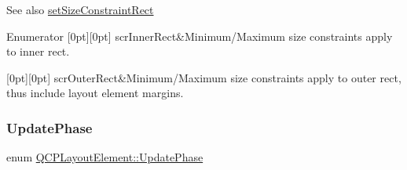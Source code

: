 \begin{DoxySeeAlso}{See also}
\mbox{\hyperlink{class_q_c_p_layout_element_a361666cdcc6fbfd37344cc44be746b0f}{set\+Size\+Constraint\+Rect}} 
\end{DoxySeeAlso}
\begin{DoxyEnumFields}{Enumerator}
[0pt][0pt]{}\mbox{\label{class_q_c_p_layout_element_a0afb3e5773529e4bd20e448f81be4d2aa7fa7e25cd23758b9915c64ed9f1be26c}} 
scr\+Inner\+Rect&Minimum/\+Maximum size constraints apply to inner rect. \\
\hline

[0pt][0pt]{}\mbox{\label{class_q_c_p_layout_element_a0afb3e5773529e4bd20e448f81be4d2aabe2745b41a6131ed194e13591b08e04d}} 
scr\+Outer\+Rect&Minimum/\+Maximum size constraints apply to outer rect, thus include layout element margins. \\
\hline

\end{DoxyEnumFields}
\mbox{\label{class_q_c_p_layout_element_a0d83360e05735735aaf6d7983c56374d}} 
\subsubsection{\texorpdfstring{UpdatePhase}{UpdatePhase}}
{\footnotesize\ttfamily enum \mbox{\hyperlink{class_q_c_p_layout_element_a0d83360e05735735aaf6d7983c56374d}{Q\+C\+P\+Layout\+Element\+::\+Update\+Phase}}}

